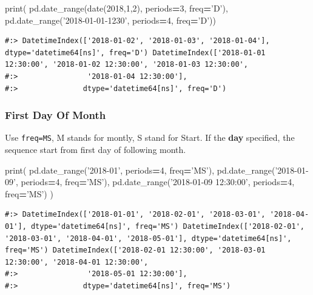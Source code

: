 \documentclass[
]{book}
\newenvironment{Shaded}{\begin{snugshade}}{\end{snugshade}}
\newcommand{\BuiltInTok}[1]{#1}
\newcommand{\DecValTok}[1]{\textcolor[rgb]{0.06,0.06,0.06}{#1}}
\newcommand{\NormalTok}[1]{#1}
\newcommand{\OperatorTok}[1]{\textcolor[rgb]{0.43,0.43,0.43}{\textbf{#1}}}
\newcommand{\StringTok}[1]{\textcolor[rgb]{0.5,0.5,0.5}{#1}}
\begin{document}
\begin{Shaded}
\begin{Highlighting}[]
\BuiltInTok{print}\NormalTok{(}
\NormalTok{  pd.date_range(date(}\DecValTok{2018}\NormalTok{,}\DecValTok{1}\NormalTok{,}\DecValTok{2}\NormalTok{), periods}\OperatorTok{=}\DecValTok{3}\NormalTok{, freq}\OperatorTok{=}\StringTok{'D'}\NormalTok{),}
\NormalTok{  pd.date_range(}\StringTok{'2018-01-01-1230'}\NormalTok{, periods}\OperatorTok{=}\DecValTok{4}\NormalTok{, freq}\OperatorTok{=}\StringTok{'D'}\NormalTok{))}
\end{Highlighting}
\end{Shaded}

\begin{verbatim}
#:> DatetimeIndex(['2018-01-02', '2018-01-03', '2018-01-04'], dtype='datetime64[ns]', freq='D') DatetimeIndex(['2018-01-01 12:30:00', '2018-01-02 12:30:00', '2018-01-03 12:30:00',
#:>                '2018-01-04 12:30:00'],
#:>               dtype='datetime64[ns]', freq='D')
\end{verbatim}

\hypertarget{first-day-of-month}{%
\subsubsection{First Day Of Month}\label{first-day-of-month}}

Use \texttt{freq=MS}, M stands for montly, S stand for Start. If the \textbf{day} specified, the sequence start from first day of following month.

\begin{Shaded}
\begin{Highlighting}[]
\BuiltInTok{print}\NormalTok{(}
\NormalTok{  pd.date_range(}\StringTok{'2018-01'}\NormalTok{, periods}\OperatorTok{=}\DecValTok{4}\NormalTok{, freq}\OperatorTok{=}\StringTok{'MS'}\NormalTok{),}
\NormalTok{  pd.date_range(}\StringTok{'2018-01-09'}\NormalTok{, periods}\OperatorTok{=}\DecValTok{4}\NormalTok{, freq}\OperatorTok{=}\StringTok{'MS'}\NormalTok{),}
\NormalTok{  pd.date_range(}\StringTok{'2018-01-09 12:30:00'}\NormalTok{, periods}\OperatorTok{=}\DecValTok{4}\NormalTok{, freq}\OperatorTok{=}\StringTok{'MS'}\NormalTok{) )}
\end{Highlighting}
\end{Shaded}

\begin{verbatim}
#:> DatetimeIndex(['2018-01-01', '2018-02-01', '2018-03-01', '2018-04-01'], dtype='datetime64[ns]', freq='MS') DatetimeIndex(['2018-02-01', '2018-03-01', '2018-04-01', '2018-05-01'], dtype='datetime64[ns]', freq='MS') DatetimeIndex(['2018-02-01 12:30:00', '2018-03-01 12:30:00', '2018-04-01 12:30:00',
#:>                '2018-05-01 12:30:00'],
#:>               dtype='datetime64[ns]', freq='MS')
\end{verbatim}
\end{document}
